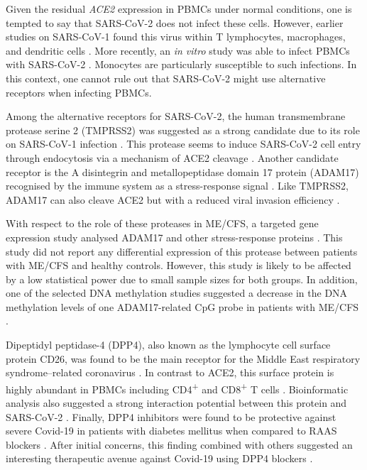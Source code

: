 Given the residual \textit{ACE2} expression in PBMCs under normal conditions, one is tempted to say that SARS-CoV-2 does not infect these cells. However, earlier studies on SARS-CoV-1 found this virus within T lymphocytes, macrophages, and dendritic cells \citep{tay2020TrinityCOVID19}. More recently, an \textit{in vitro} study was able to infect PBMCs with SARS-CoV-2 \citep{codo2020ElevatedGlucose}. Monocytes are particularly susceptible to such infections. In this context, one cannot rule out that SARS-CoV-2 might use alternative receptors when infecting PBMCs.

Among the alternative receptors for SARS-CoV-2, the human transmembrane protease serine 2 (TMPRSS2) was suggested as a strong candidate \citep{sungnak2020SARSCoV2Entry} due to its role on SARS-CoV-1 infection \citep{matsuyama2010EfficientActivation, glowacka2011EvidenceThat}. This protease seems to induce SARS-CoV-2 cell entry through endocytosis via a mechanism of ACE2 cleavage \citep{hoffmann2020SARSCoV2Cell}. Another candidate receptor is the A disintegrin and metallopeptidase domain 17 protein (ADAM17) recognised by the immune system as a stress-response signal \citep{dusterhoft2019MetalloproteaseADAM17}. Like TMPRSS2, ADAM17 can also cleave ACE2 but with a reduced viral invasion efficiency \citep{heurich2014TMPRSS2ADAM17}.

With respect to the role of these proteases in ME/CFS, a targeted gene expression study analysed ADAM17 and other stress-response proteins \citep{saikiIdentificationMarkerGenes2008}. This study did not report any differential expression of this protease between patients with ME/CFS and healthy controls. However, this study is likely to be affected by a low statistical power due to small sample sizes for both groups. In addition, one of the selected DNA methylation studies suggested a decrease in the DNA methylation levels of one ADAM17-related CpG probe in patients with ME/CFS \citep{trivedi2018IdentificationMyalgic}.

Dipeptidyl peptidase-4 (DPP4), also known as the lymphocyte cell surface protein CD26, was found to be the main receptor for the Middle East respiratory syndrome–related coronavirus \citep{vandoremalen2014HostSpecies, widagdo2019SpeciesSpecificColocalization}. In contrast to ACE2, this surface protein is highly abundant in PBMCs including CD4\textsuperscript{+} and CD8\textsuperscript{+} T cells \citep{radzikowska2020DistributionACE2}. Bioinformatic analysis also suggested a strong interaction potential between this protein and SARS-CoV-2 \citep{li2020MERSCoVReceptor, vankadari2020EmergingWuHan}. Finally, DPP4 inhibitors were found to be protective against severe Covid-19 in patients with diabetes mellitus when compared to RAAS blockers \citep{rhee2021EffectsDPP4}. After initial concerns, this finding combined with others suggested an interesting therapeutic avenue against Covid-19 using DPP4 blockers \citep{scheen2021DPP4Inhibition}.

